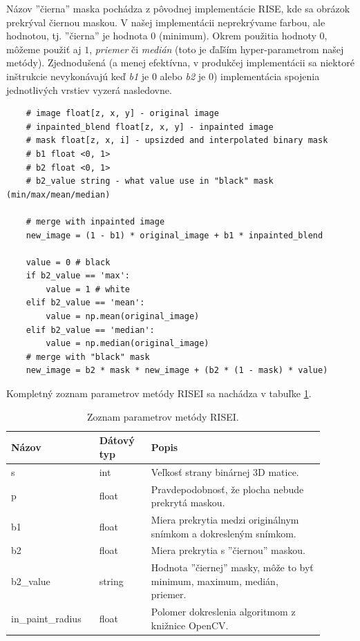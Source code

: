 Názov ''čierna'' maska pochádza z pôvodnej implementácie RISE, kde sa obrázok prekrýval čiernou maskou. V našej implementácii neprekrývame farbou, ale hodnotou, tj. ''čierna'' je hodnota $0$ (minimum). Okrem použitia hodnoty $0$, môžeme použiť aj $1$, \textit{priemer} či \textit{medián} (toto je ďaľším hyper-parametrom našej metódy). Zjednodušená (a menej efektívna, v produkčej implementácii sa niektoré inštrukcie nevykonávajú keď \textit{b1} je 0 alebo \textit{b2} je 0) implementácia spojenia jednotlivých vrstiev vyzerá nasledovne.

\begin{lstlisting}
    # image float[z, x, y] - original image
    # inpainted_blend float[z, x, y] - inpainted image
    # mask float[z, x, i] - upsizded and interpolated binary mask
    # b1 float <0, 1>
    # b2 float <0, 1>
    # b2_value string - what value use in "black" mask (min/max/mean/median)

    # merge with inpainted image
    new_image = (1 - b1) * original_image + b1 * inpainted_blend

    value = 0 # black
    if b2_value == 'max':
        value = 1 # white
    elif b2_value == 'mean':
        value = np.mean(original_image)
    elif b2_value == 'median':
        value = np.median(original_image)
    # merge with "black" mask
    new_image = b2 * mask * new_image + (b2 * (1 - mask) * value)
\end{lstlisting}

Kompletný zoznam parametrov metódy RISEI sa nachádza v tabuľke \ref{tab:risei_params}.

\begin{table}[H]
    \begin{tabular}{p{0.25\linewidth} | p{0.15\linewidth} | p{0.5\linewidth}}
        \hline
        Názov             & Dátový typ & Popis                                                               \\ \hline
        s                 & int        & Veľkosť strany binárnej 3D matice.                                        \\
        p                 & float      & Pravdepodobnosť, že plocha nebude prekrytá maskou.                        \\
        b1                & float      & Miera prekrytia medzi originálnym snímkom a dokresleným snímkom.          \\
        b2                & float      & Miera prekrytia s ''čiernou'' maskou.                                     \\
        b2\_value         & string     & Hodnota ''čiernej'' masky, môže to byť minimum, maximum, medián, priemer. \\
        in\_paint\_radius & float      & Polomer dokreslenia algoritmom z knižnice OpenCV.                         \\ \hline
    \end{tabular}
    \caption{Zoznam parametrov metódy RISEI.}
    \label{tab:risei_params}
\end{table}

